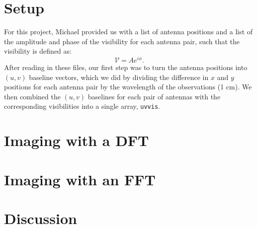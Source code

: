 \documentclass[11pt,letterpaper]{article}
\begin{document}
\section{Setup}
For this project, Michael provided us with a list of antenna positions and a 
list of the amplitude and phase of the visibility for each antenna pair, such 
that the visibility is defined as:
\begin{equation}
\mathcal{V}=Ae^{i\phi}.
\end{equation}
After reading in these files, our first step was to turn the antenna positions 
into $(u,v)$ baseline vectors, which we did by dividing the difference in 
$x$ and $y$ positions for each antenna pair by the wavelength of the 
observations (1 cm).  We then combined the $(u,v)$ baselines for 
each pair of antennas with the corresponding visibilities into a 
single array, \texttt{uvvis}.

\section{Imaging with a DFT}


\section{Imaging with an FFT}

\section{Discussion}
\end{document}
